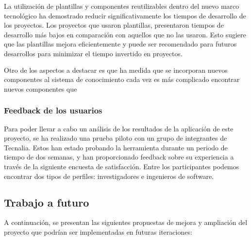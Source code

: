 La utilización de plantillas y componentes reutilizables dentro del nuevo 
marco tecnológico ha demostrado reducir significativamente los tiempos de 
desarrollo de los proyectos. Los proyectos que usaron plantillas, 
presentaron tiempos de desarrollo más bajos en comparación con aquellos que no 
las usaron. Esto sugiere que las plantillas mejora eficientemente y puede ser 
recomendado para futuros desarrollos para minimizar el tiempo invertido en proyectos.\medskip

Otro de los aspectos a destacar es que ha medida que se incorporan nuevos componentes 
al sistema de conocimiento cada vez es más complicado encontrar nuevos componentes
que 

\subsubsection{Feedback de los usuarios}
Para poder llevar a cabo un análisis de los resultados de la aplicación
de este proyecto, se ha realizado una prueba piloto con un grupo de integrantes
de Tecnalia. Estos han estado probando la herramienta durante un periodo de tiempo
de dos semanas, y han proporcionado feedback sobre su experiencia a través de
la siguiente encuesta de satisfacción. Entre los participantes podemos encontrar
dos tipos de perfiles: investigadores e ingenieros de software.

\subsection{Trabajo a futuro}
A continuación, se presentan las siguientes propuestas de mejora y ampliación
del proyecto que podrían ser implementadas en futuras iteraciones:

